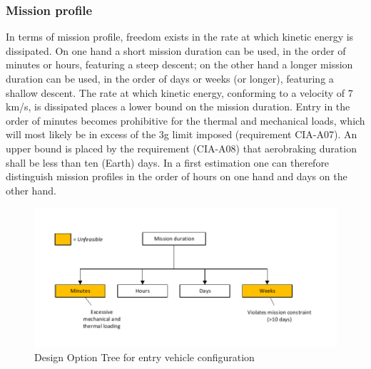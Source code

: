 \subsubsection{Mission profile} \label{sec:DOTprofile}
In terms of mission profile, freedom exists in the rate at which kinetic energy is dissipated. On one hand a short mission duration can be used, in the order of minutes or hours, featuring a steep descent; on the other hand a longer mission duration can be used, in the order of days or weeks (or longer), featuring a shallow descent. The rate at which kinetic energy, conforming to a velocity of 7 km/s, is dissipated places a lower bound on the mission duration. Entry in the order of minutes becomes prohibitive for the thermal and mechanical loads, which will most likely be in excess of the 3g limit imposed (requirement CIA-A07).  An upper bound is placed by the requirement (CIA-A08) that aerobraking duration shall be less than ten (Earth) days. In a first estimation one can therefore distinguish mission profiles in the order of hours on one hand and days on the other hand. 
\begin{figure}[H]
\centering
\includegraphics[width = 1.0\textwidth]{Figure/DOT_missionduration.pdf}
\vspace{-5mm}
\caption{Design Option Tree for entry vehicle configuration}
\label{fig:dotconfig}
\end{figure}

